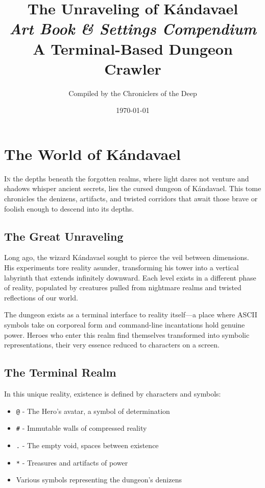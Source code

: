 \documentclass[11pt,a4paper]{book}
\title{
    \Huge\textbf{\color{bloodred}The Unraveling of Kándavael}\\
    \vspace{0.5cm}
    \Large\textit{\color{dungeonstone}Art Book \& Settings Compendium}\\
    \vspace{0.3cm}
    \normalsize{A Terminal-Based Dungeon Crawler}
}
\author{Compiled by the Chroniclers of the Deep}
\date{\today}
\begin{document}
\frontmatter
\maketitle

\tableofcontents

\mainmatter

\chapter{The World of Kándavael}

\lettrine[lines=3]{\color{bloodred}I}{n} the depths beneath the forgotten realms, where light dares not venture and shadows whisper ancient secrets, lies the cursed dungeon of Kándavael. This tome chronicles the denizens, artifacts, and twisted corridors that await those brave or foolish enough to descend into its depths.

\section{The Great Unraveling}

\begin{lorebox}
Long ago, the wizard Kándavael sought to pierce the veil between dimensions. His experiments tore reality asunder, transforming his tower into a vertical labyrinth that extends infinitely downward. Each level exists in a different phase of reality, populated by creatures pulled from nightmare realms and twisted reflections of our world.
\end{lorebox}

The dungeon exists as a terminal interface to reality itself—a place where ASCII symbols take on corporeal form and command-line incantations hold genuine power. Heroes who enter this realm find themselves transformed into symbolic representations, their very essence reduced to characters on a screen.

\section{The Terminal Realm}

In this unique reality, existence is defined by characters and symbols:
\begin{itemize}
    \item \texttt{@} - The Hero's avatar, a symbol of determination
    \item \texttt{\#} - Immutable walls of compressed reality
    \item \texttt{.} - The empty void, spaces between existence
    \item \texttt{*} - Treasures and artifacts of power
    \item Various symbols representing the dungeon's denizens
\end{itemize}
\end{document}
